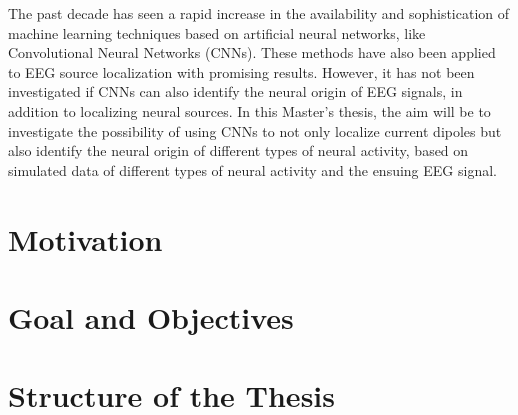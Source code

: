 \documentclass[a4paper, UKenglish, 11pt]{uiomaster}
\begin{document}
The past decade has seen a rapid increase in the availability and sophistication of machine learning techniques based on artificial neural networks, like Convolutional Neural Networks (CNNs). These methods have also been applied to EEG source localization with promising results. However, it has not been investigated if CNNs can also identify the neural origin of EEG signals, in addition to localizing neural sources. In this Master’s thesis, the aim will be to investigate the possibility of using CNNs to not only localize current dipoles but also identify the neural origin of different types of neural activity, based on simulated data of different types of neural activity and the ensuing EEG signal.

\section{Motivation}
\section{Goal and Objectives}
\section{Structure of the Thesis}
\end{document}

